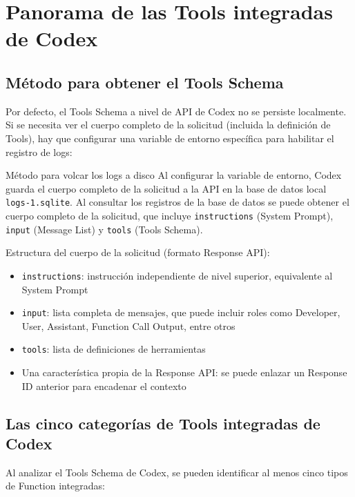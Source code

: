 \section{Panorama de las Tools integradas de Codex}

\subsection{Método para obtener el Tools Schema}

Por defecto, el Tools Schema a nivel de API de Codex no se persiste localmente. Si se necesita ver el cuerpo completo de la solicitud (incluida la definición de Tools), hay que configurar una variable de entorno específica para habilitar el registro de logs:

\begin{warningbox}{Método para volcar los logs a disco}
Al configurar la variable de entorno, Codex guarda el cuerpo completo de la solicitud a la API en la base de datos local \texttt{logs-1.sqlite}. Al consultar los registros de la base de datos se puede obtener el cuerpo completo de la solicitud, que incluye \texttt{instructions} (System Prompt), \texttt{input} (Message List) y \texttt{tools} (Tools Schema).
\end{warningbox}

Estructura del cuerpo de la solicitud (formato Response API):

\begin{itemize}
    \item \texttt{instructions}: instrucción independiente de nivel superior, equivalente al System Prompt
    \item \texttt{input}: lista completa de mensajes, que puede incluir roles como Developer, User, Assistant, Function Call Output, entre otros
    \item \texttt{tools}: lista de definiciones de herramientas
    \item Una característica propia de la Response API: se puede enlazar un Response ID anterior para encadenar el contexto
\end{itemize}

\subsection{Las cinco categorías de Tools integradas de Codex}

Al analizar el Tools Schema de Codex, se pueden identificar al menos cinco tipos de Function integradas:

